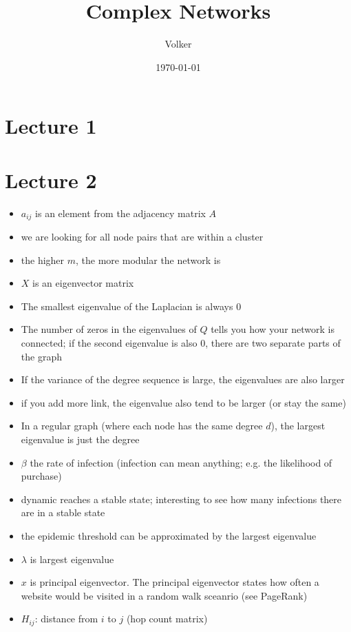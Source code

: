\documentclass{article}
\title{Complex Networks}
\date{\today}
\author{Volker}
\begin{document}
\maketitle

\section{Lecture 1}

\section{Lecture 2}
\label{sec:lecture2}

\begin{itemize}
\item $a_{ij}$ is an element from the adjacency matrix $A$
\item we are looking for all node pairs that are within a cluster
\item the higher $m$, the more modular the network is
\item $X$ is an eigenvector matrix
\item The smallest eigenvalue of the Laplacian is always 0
\item The number of zeros in the eigenvalues of $Q$ tells you how your
  network is connected; if the second eigenvalue is also 0, there are
  two separate parts of the graph
\item If the variance of the degree sequence is large, the eigenvalues
  are also larger
\item if you add more link, the eigenvalue also tend to be larger (or
  stay the same)
\item In a regular graph (where each node has the same degree $d$),
  the largest eigenvalue is just the degree
\item $\beta$ the rate of infection (infection can mean anything;
  e.g. the likelihood of purchase)
\item dynamic reaches a stable state; interesting to see how many
  infections there are in a stable state
\item the epidemic threshold can be approximated by the largest
  eigenvalue
\item $\lambda$ is largest eigenvalue
\item $x$ is principal eigenvector. The principal eigenvector states
  how often a website would be visited in a random walk sceanrio (see
  PageRank)
\item $H_{ij}$: distance from $i$ to $j$ (hop count matrix)
\end{itemize}
\end{document}

